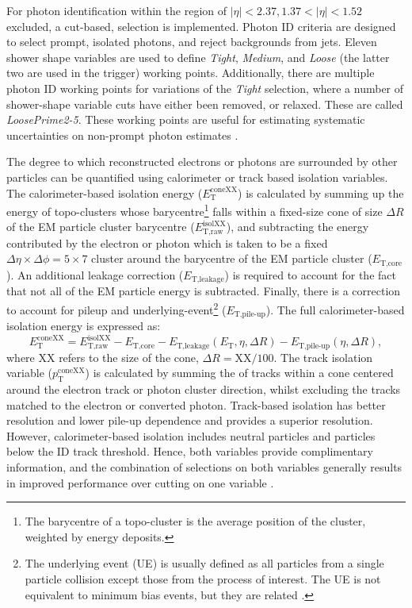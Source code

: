 For photon identification within the region of $|\eta|<2.37, 1.37 < |\eta| < 1.52$ excluded, a cut-based, selection is implemented. Photon ID criteria are designed to select prompt, isolated photons, and reject backgrounds from jets. Eleven shower shape variables are used to define \textit{Tight}, \textit{Medium}, and \textit{Loose} (the latter two are used in the trigger) working points. Additionally, there are multiple photon ID working points for variations of the \textit{Tight} selection, where a number of shower-shape variable cuts have either been removed, or relaxed. These are called \textit{LoosePrime2-5}. These working points are useful for estimating systematic uncertainties on non-prompt photon estimates \cite{Atlas:egam_reco,Atlas:egamcal_run2}. 

The degree to which reconstructed electrons or photons are surrounded by other particles can be quantified using calorimeter or track based isolation variables. The calorimeter-based isolation energy ($E_{\text{T}}^{\text{coneXX}}$) is calculated by summing up the energy of topo-clusters whose barycentre\footnote{The barycentre of a topo-cluster is the average position of the cluster, weighted by energy deposits.} falls within a fixed-size cone of size $\Delta R$ of the EM particle cluster barycentre ($E_{\text{T,raw}}^{\text{isolXX}}$), and subtracting the energy contributed by the electron or photon which is taken to be a fixed $\Delta\eta\times\Delta\phi=5\times7$ cluster around the barycentre of the EM particle cluster ($E_{\text{T,core}}$). An additional leakage correction ($E_{\text{T,leakage}}$) is required to account for the fact that not all of the EM particle energy is subtracted. Finally, there is a correction to account for pileup and underlying-event\footnote{The underlying event (UE) is usually defined as all particles from a single particle collision except those from the process of interest. The UE is not equivalent to minimum bias events, but they are related \cite{Atlas:ue}.} ($E_{\text{T,pile-up}}$). The full calorimeter-based isolation energy is expressed as:
\begin{equation}
    E_{\text{T}}^{\text{coneXX}}=E_{\text{T,raw}}^{\text{isolXX}}-E_{\text{T,core}}-E_{\text{T,leakage}}(E_{\text{T}},\eta,\Delta R)-E_{\text{T,pile-up}}(\eta,\Delta R),
\end{equation}
where XX refers to the size of the cone, $\Delta R=\text{XX}/100$. The track isolation variable ($p_{\text{T}}^{\text{coneXX}}$) is calculated by summing the \pt of tracks within a cone centered around the electron track or photon cluster direction, whilst excluding the tracks matched to the electron or converted photon. Track-based isolation has better resolution and lower pile-up dependence and provides a superior \pt resolution. However, calorimeter-based isolation includes neutral particles and particles below the ID track \pt threshold. Hence, both variables provide complimentary information, and the combination of selections on both variables generally results in improved performance over cutting on one variable \cite{Atlas:egam_reco}.


